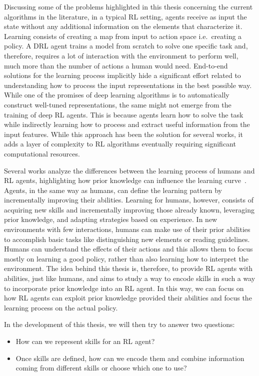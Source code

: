 Discussing some of the problems highlighted in this thesis concerning the current algorithms in the literature, in a typical RL setting, agents receive as input the state without any additional information on the elements that characterize it.
Learning consists of creating a map from input to action space i.e.\ creating a policy.
A DRL agent trains a model from scratch to solve one specific task and, therefore, requires a lot of interaction with the environment to perform well, much more than the number of actions a human would need.
End-to-end solutions for the learning process implicitly hide a significant effort related to understanding how to process the input representations in the best possible way.
While one of the promises of deep learning algorithms is to automatically construct well-tuned representations, the same might not emerge from the training of deep RL agents. 
This is because agents learn how to solve the task while indirectly learning how to process and extract useful information from the input features. 
While this approach has been the solution for several works, it adds a layer of complexity to RL algorithms eventually requiring significant computational resources.

Several works analyze the differences between the learning process of humans and RL agents, highlighting how prior knowledge can influence the learning curve~\citep{lake2017building, dubey2018investigating}.
Agents, in the same way as humans, can define the learning pattern by incrementally improving their abilities.
Learning for humans, however, consists of acquiring new skills and incrementally improving those already known, leveraging prior knowledge, and adapting strategies based on experience.
In new environments with few interactions, humans can make use of their prior abilities to accomplish basic tasks like distinguishing new elements or reading guidelines.
Humans can understand the effects of their actions and this allows them to focus mostly on learning a good policy, rather than also learning how to interpret the environment. 
The idea behind this thesis is, therefore, to provide RL agents with abilities, just like humans, and aims to study a way to encode skills in such a way to incorporate prior knowledge into an RL agent.
In this way, we can focus on how RL agents can exploit prior knowledge provided their abilities and focus the learning process on the actual policy.


In the development of this thesis, we will then try to answer two questions:
\begin{itemize}
    \item How can we represent skills for an RL agent?
    \item Once skills are defined, how can we encode them and combine information coming from different skills or choose which one to use?
\end{itemize}


